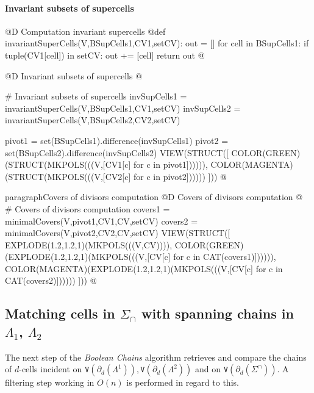 \documentclass[11pt,oneside]{article}	%
\begin{document}
\paragraph{Invariant subsets of supercells}

@D Computation invariant supercells
@{def invariantSuperCells(V,BSupCells1,CV1,setCV):
	out = []
	for cell in BSupCells1:
		if tuple(CV1[cell]) in setCV: out += [cell]
	return out
@}

@D Invariant subsets of supercells
@{# Invariant subsets of supercells
invSupCells1 = invariantSuperCells(V,BSupCells1,CV1,setCV)
invSupCells2 = invariantSuperCells(V,BSupCells2,CV2,setCV)

pivot1 = set(BSupCells1).difference(invSupCells1)
pivot2 = set(BSupCells2).difference(invSupCells2)
VIEW(STRUCT([ 
	COLOR(GREEN)(STRUCT(MKPOLS(((V,[CV1[c] for c in pivot1]))))), 
	COLOR(MAGENTA)(STRUCT(MKPOLS(((V,[CV2[c] for c in pivot2]))))) 
]))
@}
paragraph{Covers of divisors computation}
@D Covers of divisors computation
@{
# Covers of divisors computation
covers1 = minimalCovers(V,pivot1,CV1,CV,setCV)
covers2 = minimalCovers(V,pivot2,CV2,CV,setCV)	
VIEW(STRUCT([ 
	EXPLODE(1.2,1.2,1)(MKPOLS(((V,CV)))), 
	COLOR(GREEN)(EXPLODE(1.2,1.2,1)(MKPOLS(((V,[CV[c] for c in CAT(covers1)]))))), 
	COLOR(MAGENTA)(EXPLODE(1.2,1.2,1)(MKPOLS(((V,[CV[c] for c in CAT(covers2)])))))
	 ]))
@}


\subsection{Matching cells in $\Sigma_\cap$ with spanning chains in $\Lambda_1$, $\Lambda_2$}

The next step of the \emph{Boolean Chains} algorithm retrieves and compare the chains of $d$-cells incident on $\texttt{V}(\partial_d(\Lambda^1)), \texttt{V}(\partial_d(\Lambda^2))$ and on $\texttt{V}(\partial_d(\Sigma^\cap))$. A filtering step working in $O(n)$ is performed in regard to this.
\end{document}
